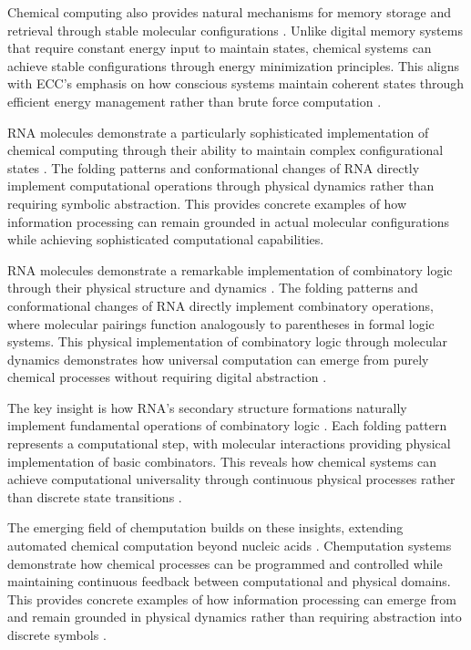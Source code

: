 \begin{refsection}
Chemical computing also provides natural mechanisms for memory storage and retrieval through stable molecular configurations \cite{Qian2011, gershman2023molecular}. Unlike digital memory systems that require constant energy input to maintain states, chemical systems can achieve stable configurations through energy minimization principles. This aligns with ECC's emphasis on how conscious systems maintain coherent states through efficient energy management rather than brute force computation \cite{Soloveichik2010}.

RNA molecules demonstrate a particularly sophisticated implementation of chemical computing through their ability to maintain complex configurational states \cite{Wang2021}. The folding patterns and conformational changes of RNA directly implement computational operations through physical dynamics rather than requiring symbolic abstraction. This provides concrete examples of how information processing can remain grounded in actual molecular configurations while achieving sophisticated computational capabilities.

RNA molecules demonstrate a remarkable implementation of combinatory logic through their physical structure and dynamics \cite{Adamatzky2021,akhlaghpour2022rna}. The folding patterns and conformational changes of RNA directly implement combinatory operations, where molecular pairings function analogously to parentheses in formal logic systems. This physical implementation of combinatory logic through molecular dynamics demonstrates how universal computation can emerge from purely chemical processes without requiring digital abstraction \cite{Hjelmfelt1991}.

The key insight is how RNA's secondary structure formations naturally implement fundamental operations of combinatory logic \cite{Qian2011,akhlaghpour2022rna}. Each folding pattern represents a computational step, with molecular interactions providing physical implementation of basic combinators. This reveals how chemical systems can achieve computational universality through continuous physical processes rather than discrete state transitions \cite{Soloveichik2010}.

The emerging field of chemputation builds on these insights, extending automated chemical computation beyond nucleic acids \cite{Szacilowski2012}. Chemputation systems demonstrate how chemical processes can be programmed and controlled while maintaining continuous feedback between computational and physical domains. This provides concrete examples of how information processing can emerge from and remain grounded in physical dynamics rather than requiring abstraction into discrete symbols \cite{Wang2021}.


\end{refsection}
